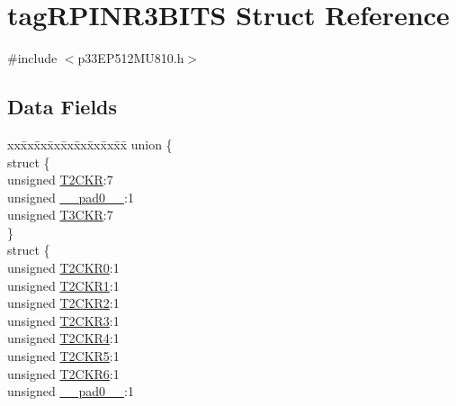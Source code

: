\hypertarget{structtag_r_p_i_n_r3_b_i_t_s}{}\section{tag\+R\+P\+I\+N\+R3\+B\+I\+TS Struct Reference}
\label{structtag_r_p_i_n_r3_b_i_t_s}


{\ttfamily \#include $<$p33\+E\+P512\+M\+U810.\+h$>$}

\subsection*{Data Fields}
\begin{DoxyCompactItemize}
\item 
\begin{tabbing}
xx\=xx\=xx\=xx\=xx\=xx\=xx\=xx\=xx\=\kill
union \{\\
\>struct \{\\
\>\>unsigned \hyperlink{structtag_r_p_i_n_r3_b_i_t_s_a67227c66a04a05ff56501d0a0cdb0914}{T2CKR}:7\\
\>\>unsigned \hyperlink{structtag_r_p_i_n_r3_b_i_t_s_adf71f3d8410c1f1dbbc96680a92c49af}{\_\_pad0\_\_}:1\\
\>\>unsigned \hyperlink{structtag_r_p_i_n_r3_b_i_t_s_a26d046b30ce782f2fa17e44a72a5ea48}{T3CKR}:7\\
\>\} \\
\>struct \{\\
\>\>unsigned \hyperlink{structtag_r_p_i_n_r3_b_i_t_s_a4511e553c027e4ce81c11d32978eb019}{T2CKR0}:1\\
\>\>unsigned \hyperlink{structtag_r_p_i_n_r3_b_i_t_s_a7edb77277d809dd698e8ed5c04fa5eeb}{T2CKR1}:1\\
\>\>unsigned \hyperlink{structtag_r_p_i_n_r3_b_i_t_s_a28d8a1edcefda3ef6cad337658191e66}{T2CKR2}:1\\
\>\>unsigned \hyperlink{structtag_r_p_i_n_r3_b_i_t_s_a7f7ac50f6bfd8aae0260bf34e9fc96e0}{T2CKR3}:1\\
\>\>unsigned \hyperlink{structtag_r_p_i_n_r3_b_i_t_s_a328917e5a729fcddf11fdda2297800e3}{T2CKR4}:1\\
\>\>unsigned \hyperlink{structtag_r_p_i_n_r3_b_i_t_s_af02c3ca3a6bd5bd75ff4af702f826fca}{T2CKR5}:1\\
\>\>unsigned \hyperlink{structtag_r_p_i_n_r3_b_i_t_s_ab5a46a27cc8c7e0dcb79e1c7eb5b0d77}{T2CKR6}:1\\
\>\>unsigned \hyperlink{structtag_r_p_i_n_r3_b_i_t_s_adf71f3d8410c1f1dbbc96680a92c49af}{\_\_pad0\_\_}:1\\

\end{tabbing}
\end{DoxyCompactItemize}
